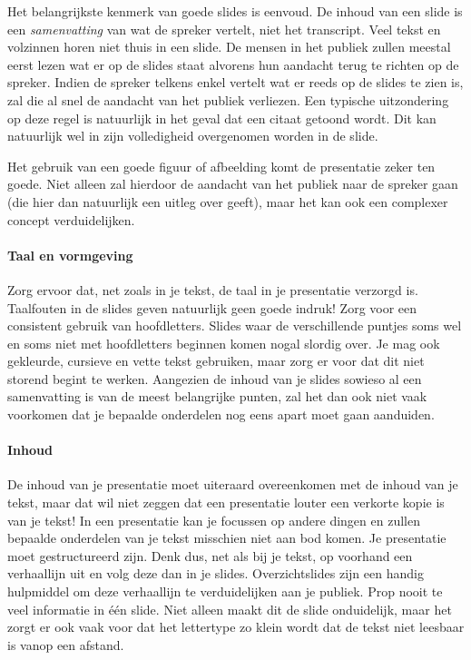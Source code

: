 \documentclass[a4paper]{article}
\begin{document}
Het belangrijkste kenmerk van goede slides is eenvoud.
De inhoud van een slide is een \textit{samenvatting} van wat de spreker vertelt, niet het transcript.
Veel tekst en volzinnen horen niet thuis in een slide.
De mensen in het publiek zullen meestal eerst lezen wat er op de slides staat alvorens hun aandacht terug te richten op de spreker.
Indien de spreker telkens enkel vertelt wat er reeds op de slides te zien is, zal die al snel de aandacht van het publiek verliezen.
Een typische uitzondering op deze regel is natuurlijk in het geval dat een citaat getoond wordt.
Dit kan natuurlijk wel in zijn volledigheid overgenomen worden in de slide.

Het gebruik van een goede figuur of afbeelding komt de presentatie zeker ten goede.
Niet alleen zal hierdoor de aandacht van het publiek naar de spreker gaan (die hier dan natuurlijk een uitleg over geeft), maar het kan ook een complexer concept verduidelijken.


\paragraph{Taal en vormgeving}

Zorg ervoor dat, net zoals in je tekst, de taal in je presentatie verzorgd is.
Taalfouten in de slides geven natuurlijk geen goede indruk!
Zorg voor een consistent gebruik van hoofdletters.
Slides waar de verschillende puntjes soms wel en soms niet met hoofdletters beginnen komen nogal slordig over.
Je mag ook gekleurde, cursieve en vette tekst gebruiken, maar zorg er voor dat dit niet storend begint te werken.
Aangezien de inhoud van je slides sowieso al een samenvatting is van de meest belangrijke punten, zal het dan ook niet vaak voorkomen dat je bepaalde onderdelen nog eens apart moet gaan aanduiden.


\paragraph{Inhoud}

De inhoud van je presentatie moet uiteraard overeenkomen met de inhoud van je tekst, maar dat wil niet zeggen dat een presentatie louter een verkorte kopie is van je tekst!
In een presentatie kan je focussen op andere dingen en zullen bepaalde onderdelen van je tekst misschien niet aan bod komen.
Je presentatie moet gestructureerd zijn.
Denk dus, net als bij je tekst, op voorhand een verhaallijn uit en volg deze dan in je slides.
Overzichtslides zijn een handig hulpmiddel om deze verhaallijn te verduidelijken aan je publiek.
Prop nooit te veel informatie in \'e\'en slide.
Niet alleen maakt dit de slide onduidelijk, maar het zorgt er ook vaak voor dat het lettertype zo klein wordt dat de tekst niet leesbaar is vanop een afstand.
\end{document}
